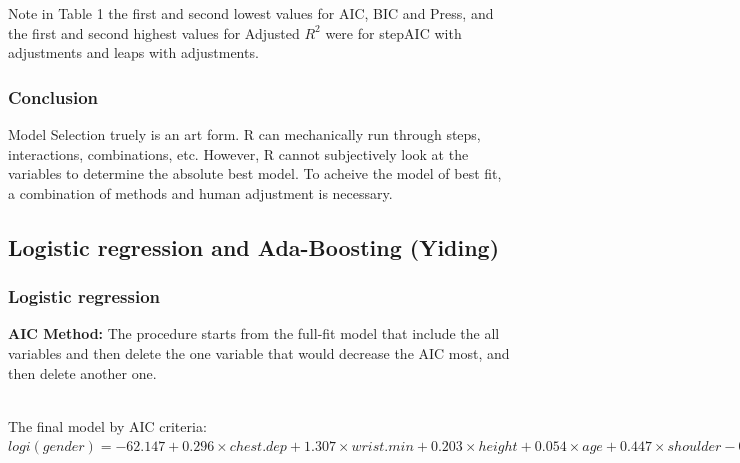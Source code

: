 \documentclass[11pt]{article}\usepackage[]{graphicx}\usepackage[]{color}
\begin{document}
Note in Table 1 the first and second lowest values for AIC, BIC and Press, and the first and second highest values for Adjusted $R^2$ were for stepAIC with adjustments and leaps with adjustments.

\subsubsection{Conclusion}
Model Selection truely is an art form. R can mechanically run through steps, interactions, combinations, etc. However, R cannot subjectively look at the variables to determine the absolute best model. To acheive the model of best fit, a combination of methods and human adjustment is necessary.

\newpage

\subsection{Logistic regression and Ada-Boosting (Yiding)}

\subsubsection{Logistic regression}

\textbf{AIC Method:} The procedure starts from the full-fit model that include the all variables and then delete the one variable that would decrease the AIC most, and then delete another one.
\begin{table}[ht]
\centering
{}
\end{table}
\\
The final model by AIC criteria: $logi(gender)=-62.147 +0.296\times chest.dep + 1.307\times wrist.min + 0.203\times height + 0.054\times age + 0.447\times shoulder - 0.506\times hip$\\
\end{document}
